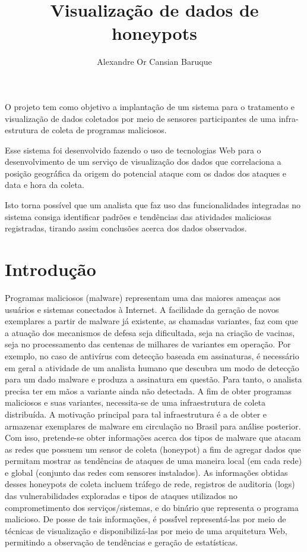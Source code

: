 \documentclass[%
        Portuguese,%
        ]
{ic-tese-v2}
\begin{document}
\title{ Visualização de dados de honeypots }

\author{Alexandre Or Cansian Baruque}


\beforepreface

\begin{oresumo}
O projeto tem como objetivo a implantação de um sistema para o tratamento e visualização de dados coletados por meio de sensores participantes de uma infra-estrutura de coleta de programas maliciosos.

Esse sistema foi desenvolvido fazendo o uso de tecnologias Web para o desenvolvimento de um serviço de visualização dos dados que correlaciona a posição geográ́fica da origem do potencial ataque com os dados dos ataques e data e hora da coleta.

Isto torna possível que um analista que faz uso das funcionalidades integradas no sistema consiga identificar padrões e tendências das atividades maliciosas registradas, tirando assim conclusões acerca dos dados observados.
\end{oresumo}

\afterpreface	

\chapter{Introdução}
Programas maliciosos (malware) representam uma das maiores ameaças aos usuários e sistemas conectados à Internet. A facilidade da geração de novos exemplares a partir de malware já existente, as chamadas variantes, faz com que a atuação dos mecanismos de defesa seja dificultada, seja na criação de vacinas, seja no processamento das centenas de milhares de variantes em operação. Por exemplo, no caso de antivírus com detecção baseada em assinaturas, é necessário em geral a atividade de um analista humano que descubra um modo de detecção para um dado malware e produza a assinatura em questão. Para tanto, o analista precisa ter em mãos a variante ainda não detectada.
A fim de obter programas maliciosos e suas variantes, necessita-se de uma infraestrutura de coleta distribuída. A motivação principal para tal infraestrutura é a de obter e armazenar exemplares de malware em circulação no Brasil para aná́lise posterior. Com isso, pretende-se obter informações acerca dos tipos de malware que
atacam as redes que possuem um sensor de coleta (honeypot) a fim de agregar dados que permitam mostrar as tendências de ataques de uma maneira local (em cada rede) e global (conjunto das redes com sensores instalados).
As informações obtidas desses honeypots de coleta incluem tráfego de rede, registros de auditoria (logs) das vulnerabilidades exploradas e tipos de ataques utilizados no comprometimento dos serviços/sistemas, e do biná́rio que representa o programa malicioso. De posse de tais informações, é possí́vel representá-las por meio de técnicas de visualização e disponibilizá-las por meio de uma arquitetura Web, permitindo a observação de tendências e geração de estatísticas.
\end{document}
